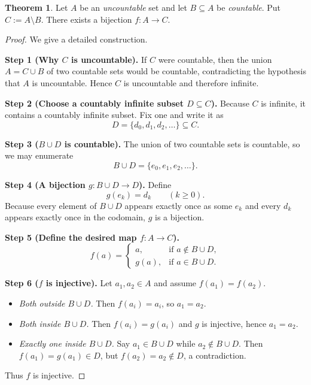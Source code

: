 \documentclass[12pt]{article}
\theoremstyle{definition} %
\newtheorem{theorem}{Theorem}
\theoremstyle{plain} %
\begin{document}
    \begin{theorem}
      Let $A$ be an \emph{uncountable} set and let $B\subseteq A$ be
      \emph{countable}.  
      Put $C:=A\setminus B$.
      There exists a bijection $f\colon A\longrightarrow C$.
      \end{theorem}
      
      \begin{proof}
      We give a detailed construction.
      
      \medskip
      \textbf{Step 1 (Why $C$ is uncountable).}
      If $C$ were countable, then the union
      \(
      A=C\cup B
      \)
      of two countable sets would be countable,
      contradicting the hypothesis that $A$ is uncountable.
      Hence $C$ is uncountable and therefore infinite.
      
      \medskip
      \textbf{Step 2 (Choose a countably infinite subset $D\subseteq C$).}
      Because $C$ is infinite, it contains a countably infinite subset.
      Fix one and write it as
      \[
        D=\{d_0,d_1,d_2,\dots\}\subseteq C .
      \]
      
      \medskip
      \textbf{Step 3 ($B\cup D$ is countable).}
      The union of two countable sets is countable,
      so we may enumerate
      \[
        B\cup D = \{e_0,e_1,e_2,\dots\}.
      \]
      
      \medskip
      \textbf{Step 4 (A bijection $g\colon B\cup D\to D$).}
      Define
      \[
        g(e_k)=d_k\qquad(k\ge 0).
      \]
      Because every element of $B\cup D$ appears exactly once as some $e_k$
      and every $d_k$ appears exactly once in the codomain,
      $g$ is a bijection.
      
      \medskip
      \textbf{Step 5 (Define the desired map $f\colon A\to C$).}
      \[
        f(a)=
        \begin{cases}
          a,   &\text{if }a\notin B\cup D,\\[6pt]
          g(a),&\text{if }a\in B\cup D.
        \end{cases}
      \]
      
      \medskip
      \textbf{Step 6 ($f$ is injective).}
      Let $a_1,a_2\in A$ and assume $f(a_1)=f(a_2)$.
      
      \begin{itemize}
        \item \emph{Both outside $B\cup D$.}
              Then $f(a_i)=a_i$, so $a_1=a_2$.
        \item \emph{Both inside $B\cup D$.}
              Then $f(a_i)=g(a_i)$ and $g$ is injective,
              hence $a_1=a_2$.
        \item \emph{Exactly one inside $B\cup D$.}
              Say $a_1\in B\cup D$ while $a_2\notin B\cup D$.
              Then $f(a_1)=g(a_1)\in D$, but $f(a_2)=a_2\notin D$,
              a contradiction.
      \end{itemize}
      Thus $f$ is injective.
      

\end{proof}
\end{document}
